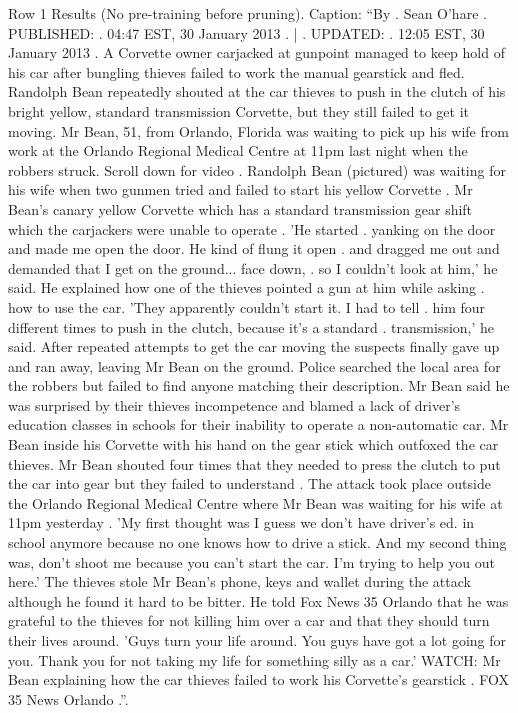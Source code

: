 \begin{table}[H]
\centering
\caption{Row 1 Results (No pre-training before pruning). \ifshowcaption{}Caption: ``By . Sean O'hare . PUBLISHED: . 04:47 EST, 30 January 2013 . | . UPDATED: . 12:05 EST, 30 January 2013 . A Corvette owner carjacked at gunpoint managed to keep hold of his car after bungling thieves failed to work the manual gearstick and fled. Randolph Bean repeatedly shouted at the car thieves to push in the clutch of his bright yellow, standard transmission Corvette, but they still failed to get it moving. Mr Bean, 51, from Orlando, Florida was waiting to pick up his wife from work at the Orlando Regional Medical Centre at 11pm last night when the robbers struck. Scroll down for video . Randolph Bean (pictured) was waiting for his wife when two gunmen tried and failed to start his yellow Corvette . Mr Bean's canary yellow Corvette which has a standard transmission gear shift which the carjackers were unable to operate . 'He started . yanking on the door and made me open the door. He kind of flung it open . and dragged me out and demanded that I get on the ground... face down, . so I couldn't look at him,' he said. He explained how one of the thieves pointed a gun at him while asking . how to use the car. 'They apparently couldn't start it. I had to tell . him four different times to push in the clutch, because it's a standard . transmission,' he said. After repeated attempts to get the car moving the suspects finally gave up and ran away, leaving Mr Bean on the ground. Police searched the local area for the robbers but failed to find anyone matching their description. Mr Bean said he was surprised by their thieves incompetence and blamed a lack of driver's education classes in schools for their inability to operate a non-automatic car. Mr Bean inside his Corvette with his hand on the gear stick which outfoxed the car thieves. Mr Bean shouted four times that they needed to press the clutch to put the car into gear but they failed to understand . The attack took place outside the Orlando Regional Medical Centre where Mr Bean was waiting for his wife at 11pm yesterday . 'My first thought was I guess we don't have driver's ed. in school anymore because no one knows how to drive a stick. And my second thing was, don't shoot me because you can't start the car. I'm trying to help you out here.' The thieves stole Mr Bean's phone, keys and wallet during the attack although he found it hard to be bitter. He told Fox News 35 Orlando that he was grateful to the thieves for not killing him over a car and that they should turn their lives around. 'Guys turn your life around. You guys have got a lot going for you. Thank you for not taking my life for something silly as a car.' WATCH: Mr Bean explaining how the car thieves failed to work his Corvette's gearstick . FOX 35 News Orlando .''.\fi}

\end{table}
